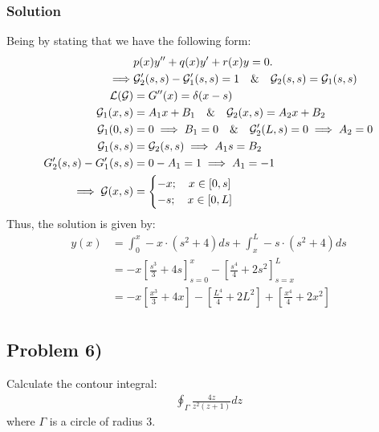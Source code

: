 \subsubsection*{Solution}
Being by stating that we have the following form:
\begin{align*}
    &p(x)y'' + q(x)y' + r(x)y = 0.\\
    \implies&\mathcal{G}_2'(s,s) - \mathcal{G}_1'(s,s) = 1 \quad \& \quad \mathcal{G}_2(s,s) = \mathcal{G}_1(s,s) \\
    \mathcal{L}(\mathcal{G}) &= G''(x) = \delta(x - s)\\
    \mathcal{G}_1(x,s) &= A_1x + B_1 \quad \&\quad \mathcal{G}_2(x,s) = A_2x + B_2\\
    \mathcal{G}_1(0,s) &= 0 \implies B_1 = 0 \quad\&\quad \mathcal{G}_2'(L,s) = 0 \implies A_2 = 0\\
    \mathcal{G}_1(s,s) &= \mathcal{G}_2(s,s)\implies A_1s = B_2\\
    G_2'(s,s) - G_1'(s,s) &= 0 - A_1 = 1 \implies A_1 = -1\\
    \implies \mathcal{G}(x,s) &= \begin{cases}
        -x; \quad x \in[0,s]\\
        -s; \quad x \in[0,L]
    \end{cases}
\end{align*}Thus, the solution is given by:
\begin{align*}
    y(x) &= \int_0^x -x \cdot (s^2 + 4)ds + \int_x^L -s \cdot (s^2 + 4)ds\\
    &= -x\left[\frac{s^3}{3}+4s\right]_{s = 0}^x - \left[\frac{s^4}{4} + 2s^2\right]_{s=x}^L\\
    &= -x\left[\frac{x^3}{3} + 4x\right] - \left[\frac{L^4}{4} + 2L^2\right] + \left[\frac{x^4}{4} + 2x^2\right]\\
\end{align*}

\subsection*{Problem 6)}
Calculate the contour integral:
\begin{align*}
    \oint_\Gamma \frac{4z}{z^2(z + 1)}dz
\end{align*}where $\Gamma$ is a circle of radius $3$.

